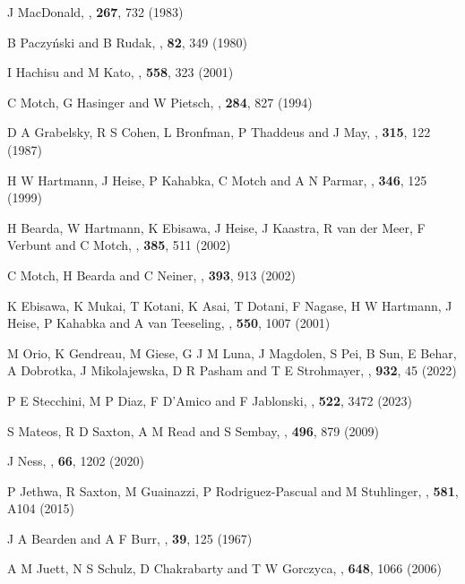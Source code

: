 \begin{thebibliography}{100}
	J MacDonald, \textit{\ApJ}, \textbf{267}, 732 (1983)
	
	B Paczy{\'n}ski and B Rudak, \textit{\AnA}, \textbf{82}, 349 (1980)
	
	I Hachisu and M Kato, \textit{\ApJ}, \textbf{558}, 323 (2001)
	
	C Motch, G Hasinger and W Pietsch, \textit{\AnA}, \textbf{284}, 827 (1994)
	
	D A Grabelsky, R S Cohen, L Bronfman, P Thaddeus and  J May, \textit{\ApJ}, \textbf{315}, 122 (1987)

	H W Hartmann, J Heise, P Kahabka, C Motch and A N Parmar, \textit{\AnA}, \textbf{346}, 125 (1999)
	
	H Bearda, W Hartmann, K Ebisawa, J Heise, J Kaastra, R van der Meer, F Verbunt and C Motch, \textit{\AnA}, \textbf{385}, 511 (2002)

	C Motch, H Bearda and C Neiner, \textit{\AnA}, \textbf{393}, 913 (2002)

	K Ebisawa, K Mukai, T Kotani, K Asai, T Dotani, F Nagase, H W Hartmann, J Heise, P Kahabka and A van Teeseling, \textit{\ApJ}, \textbf{550}, 1007 (2001)

	M Orio, K Gendreau, M Giese, G J M Luna, J Magdolen, S Pei, B Sun, E Behar, A Dobrotka, J Mikolajewska, D R Pasham and T E Strohmayer, \textit{\ApJ}, \textbf{932}, 45 (2022)
	
	P E Stecchini, M P Diaz, F D’Amico and F Jablonski, \textit{\MNRAS}, \textbf{522}, 3472 (2023)
	
	S Mateos, R D Saxton, A M Read and S Sembay, \textit{\AnA}, \textbf{496}, 879 (2009)
	
	J Ness, \textit{\ASR}, \textbf{66}, 1202 (2020)
	
	P Jethwa, R Saxton, M Guainazzi, P Rodriguez-Pascual and M Stuhlinger, \textit{\AnA}, \textbf{581}, A104 (2015)
	
	J A Bearden and A F Burr, \textit{\RMP}, \textbf{39}, 125 (1967)
	
	A M Juett, N S Schulz, D Chakrabarty and T W Gorczyca, \textit{\ApJ}, \textbf{648}, 1066 (2006)
	

\end{thebibliography}

